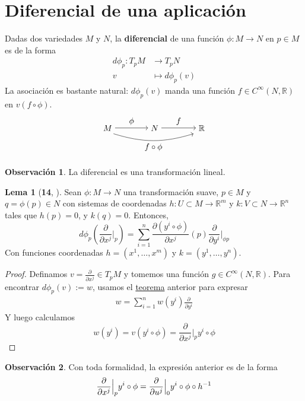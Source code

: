 \documentclass[spanish]{book}
\theoremstyle{definition}
\newtheorem*{lema}{Lema}
\newtheorem*{obs}{Observación}
\newcommand{\R}{\mathbb{R}}
\newcommand{\Cinf}{C^\infty}
\begin{document}
\section{Diferencial de una aplicación}
Dadas dos variedades $M$ y $N$, la \textbf{diferencial} de una función $\phi:M\to N$ en $p\in M$ es de la forma
\begin{align*}
	d\phi_p:T_pM&\to T_pN\\
	v&\mapsto d\phi_p(v)
\end{align*}
La asociación es bastante natural: $d\phi_p(v)$ manda una función $f\in\Cinf(N,\R)$ en $v(f\circ\phi)$.
\[\begin{tikzpicture}
	\node (A) at (0,0) {$M$};
	\node (B) at (2,0) {$N$};
	\node (C) at (4,0) {$\R$};
	\draw[->] (A) -- node[above] {$\phi$}(B);
	\draw[->] (B) -- node[above] {$f$} (C);
	\draw[->, bend right=17] ([xshift=7pt]A.south) to node[below] {$f\circ\phi$} ([xshift=-10pt]C.south);
\end{tikzpicture}\]
\begin{obs}
	La diferencial es una transformación lineal.
\end{obs}
\begin{lema}[\textbf{14}, \cite{ONeill}]\label{lema:dif-coord}
	Sean $\phi:M\to N$ una transformación suave, $p\in M$ y $q=\phi(p)\in N$ con sistemas de coordenadas $h:U\subset M\to\R^m$ y $k:V\subset N\to\R^n$ tales que $h(p)=0$, y $k(q)=0$. Entonces,
	\[d\phi_p\left(\frac{\partial}{\partial x^j}\Big|_p\right)=\sum_{i=1}^n\frac{\partial(y^i\circ\phi)}{\partial x^j}(p)\frac{\partial}{\partial y^i}\Big|_{\phi p}\]
	Con funciones coordenadas  $h=(x^1,\ldots,x^m)$ y $k=(y^1,\ldots,y^n)$.
\end{lema}
\begin{proof}
	Definamos $v=\frac{\partial}{\partial x^j}\in T_pM$ y tomemos una función $g\in\Cinf(N,\R)$. Para encontrar $d\phi_p(v):=w$, usamos el \hyperref[teo:base]{teorema} anterior para expresar
	\begin{align*}
		w=\sum_{i=1}^nw(y^i)\frac{\partial}{\partial y^i}
	\end{align*}
	Y luego calculamos
	\[w(y^i)=v(y^i\circ\phi)=\frac{\partial}{\partial x^j}\Big|_py^i\circ\phi\]
\end{proof}
\begin{obs}
	Con toda formalidad, la expresión anterior es de la forma
	\[\frac{\partial}{\partial x^j}\Big|_py^i\circ\phi\\
	=\frac{\partial}{\partial u^j}\Big|_0y^i\circ\phi\circ h^{-1}	\]
\end{obs}
\end{document}
